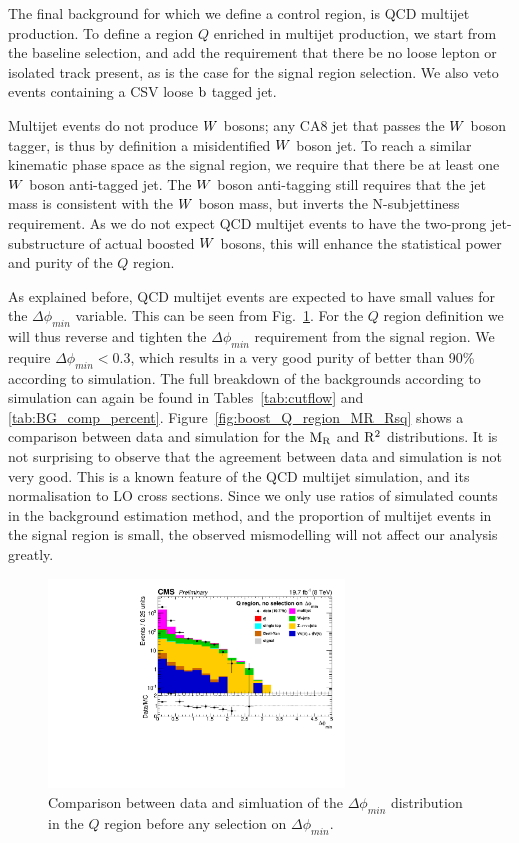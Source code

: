 The final background for which we define a control region, is QCD multijet production.
To define a region $Q$ enriched in multijet production, we start from the baseline selection, and
add the requirement that there be no loose lepton or isolated track present, as is the case for the
signal region selection. We also veto events containing a CSV loose $\mathrm{b}$ tagged jet. 

Multijet events do not produce $W$ bosons; any CA8 jet that passes the $W$ boson tagger,
is thus by definition a misidentified $W$ boson jet. To reach a similar kinematic phase space as
the signal region, we require that there be at least one $W$ boson anti-tagged jet. The $W$ boson
anti-tagging still requires that the jet mass is consistent with the $W$ boson mass, but inverts
the N-subjettiness requirement. As we do not expect QCD multijet events to have the two-prong
jet-substructure of actual boosted $W$ bosons, this will enhance the statistical power and purity
of the $Q$ region. 

As explained before, QCD multijet events are expected to have small values for the
$\Delta\phi_{min}$ variable. This can be seen from Fig.~\ref{fig:boost_Q_region_mindeltaphi}. 
For the $Q$ region definition we will thus reverse
and tighten the $\Delta\phi_{min}$ requirement from the signal region. We require $\Delta\phi_{min}
< 0.3$, which results in a very good purity of better than 90\% according to simulation. 
The full breakdown of the backgrounds according to simulation can again be found in
Tables~\ref{tab:cutflow} and \ref{tab:BG_comp_percent}.
Figure~\ref{fig:boost_Q_region_MR_Rsq} shows a comparison between data and simulation for the $\mathrm{M_R}$
and $\mathrm{R^2}$ distributions. It is not surprising to observe that the agreement between data and
simulation is not very good. This is a known feature of the QCD multijet simulation, and its
normalisation to LO cross sections. Since we only use ratios of simulated counts in the background
estimation method, and the proportion of multijet events in the signal region is small, the
observed mismodelling will not affect our analysis greatly. 

\begin{figure}[htbp]
\centering
\includegraphics[width=0.7\textwidth]{figures/razor_selection/DataMC_minDeltaPhi_0Lbg1uW0Ll_rebin}
\caption{Comparison between data and simluation of the $\Delta\phi_{min}$ distribution in the $Q$
region before any selection on $\Delta\phi_{min}$. 
\label{fig:boost_Q_region_mindeltaphi}}
\end{figure}

